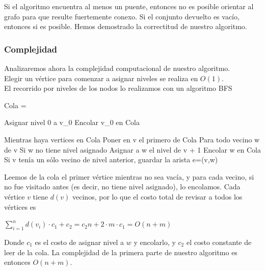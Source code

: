 Si el algoritmo encuentra al menos un puente, entonces no es posible orientar al grafo para que resulte fuertemente conexo. Si el conjunto devuelto es vacío, entonces si es posible. Hemos demostrado 
la correctitud de nuestro algoritmo. \\

\subsubsection{Complejidad}
Analizaremos ahora la complejidad computacional de nuestro algoritmo.\\

Elegir un vértice para comenzar a asignar niveles se realiza en $O(1)$. \\
El recorrido por niveles de los nodos lo realizamos con un algoritmo BFS

\begin{verbatimtab}
Cola 	= {}

Asignar nivel 0 a v_0
Encolar v_0 en Cola

Mientras haya vertices en Cola
{
    Poner en v el primero de Cola
    Para todo vecino w de v
    {
	Si w no tiene nivel asignado
	{
	    Asignar a w el nivel de v + 1
	    Encolar w en Cola
	}
    }
    Si v tenía un sólo vecino de nivel anterior, guardar la arista e=(v,w)
}
\end{verbatimtab}

Leemos de la cola el primer vértice mientras no sea vacía, y para cada vecino, si no fue visitado antes (es decir, no tiene nivel asignado), lo encolamos. Cada vértice $v$ tiene $d(v)$ vecinos, por lo que el costo 
total de revisar a todos los vértices es 
\begin{center}
 $\displaystyle\sum_{i=1}^{n} d(v_i)\cdot c_1 + c_2 = c_2n + 2\cdot m\cdot c_1 = O(n+m)$
\end{center}
Donde $c_1$ es el costo de asignar nivel a $w$ y encolarlo, y $c_2$ el costo constante de leer de la cola. La complejidad de la primera parte de nuestro algoritmo es entonces $O(n+m)$.\\

